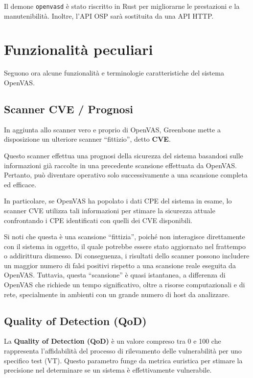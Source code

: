 Il demone \texttt{openvasd} è stato riscritto in Rust per migliorarne le prestazioni e la manutenibilità. Inoltre, l'API OSP sarà sostituita da una API HTTP.

\section{Funzionalità peculiari}
Seguono ora alcune funzionalità e terminologie caratteristiche del sistema OpenVAS.

\subsection{Scanner CVE / Prognosi}
\label{cve}
In aggiunta allo scanner vero e proprio di OpenVAS, Greenbone mette a disposizione un ulteriore scanner ``fittizio'', detto \textbf{CVE}.

Questo scanner effettua una prognosi della sicurezza del sistema basandosi sulle informazioni già raccolte in una precedente scansione effettuata da OpenVAS. Pertanto, può diventare operativo solo successivamente a una scansione completa ed efficace.

In particolare, se OpenVAS ha popolato i dati CPE del sistema in esame, lo scanner CVE utilizza tali informazioni per stimare la sicurezza attuale confrontando i CPE identificati con quelli dei CVE disponibili.

Si noti che questa è una scansione ``fittizia'', poiché non interagisce direttamente con il sistema in oggetto, il quale potrebbe essere stato aggiornato nel frattempo o addirittura dismesso. Di conseguenza, i risultati dello scanner possono includere un maggior numero di falsi positivi rispetto a una scansione reale eseguita da OpenVAS. Tuttavia, questa ``scansione'' è quasi istantanea, a differenza di OpenVAS che richiede un tempo significativo, oltre a risorse computazionali e di rete, specialmente in ambienti con un grande numero di host da analizzare.

\subsection{Quality of Detection (QoD)}
\label{qod}
La \textbf{Quality of Detection (QoD)} è un valore compreso tra 0 e 100 che rappresenta l'affidabilità del processo di rilevamento delle vulnerabilità per uno specifico test (VT). Questo parametro funge da metrica euristica per stimare la precisione nel determinare se un sistema è effettivamente vulnerabile.

